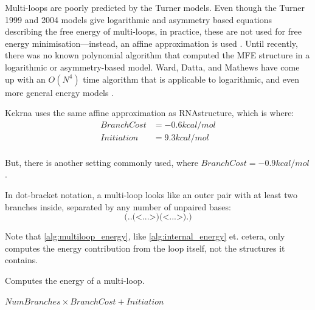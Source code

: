 \documentclass{cshonours}
\def\km{kcal/mol }
\begin{document}
Multi-loops are poorly predicted by the Turner models. Even though the Turner 1999 and 2004 models give logarithmic and asymmetry based equations describing the free energy of multi-loops, in practice, these are not used for free energy minimisation---instead, an affine approximation is used \cite{sankoffKruskal, mainville}. Until recently, there was no known polynomial algorithm that computed the MFE structure in a logarithmic or asymmetry-based model. Ward, Datta, and Mathews have come up with an $O(N^4)$ time algorithm that is applicable to logarithmic, and even more general energy models \cite{wardPersonal}.

Kekrna uses the same affine approximation as RNAstructure, which is where:
\begin{align*}
BranchCost &= -0.6 \km \\
Initiation &= 9.3 \km \\
\end{align*}

But, there is another setting commonly used, where $BranchCost = -0.9 \km$ \cite{t04}. 

In dot-bracket notation, a multi-loop looks like an outer pair with at least two branches inside, separated by any number of unpaired bases:
$$\texttt{(..(<...>)(<...>).)}$$

Note that \autoref{alg:multiloop_energy}, like \autoref{alg:internal_energy} et. cetera, only computes the energy contribution from the loop itself, not the structures it contains.

\begin{algorithm}[H]
\caption{Computes the energy of a multi-loop.}
\label{alg:multiloop_energy}
\begin{algorithmic}
\State \Return $NumBranches \times BranchCost + Initiation$
\EndFunction
\end{algorithmic}
\end{algorithm}
\end{document}

